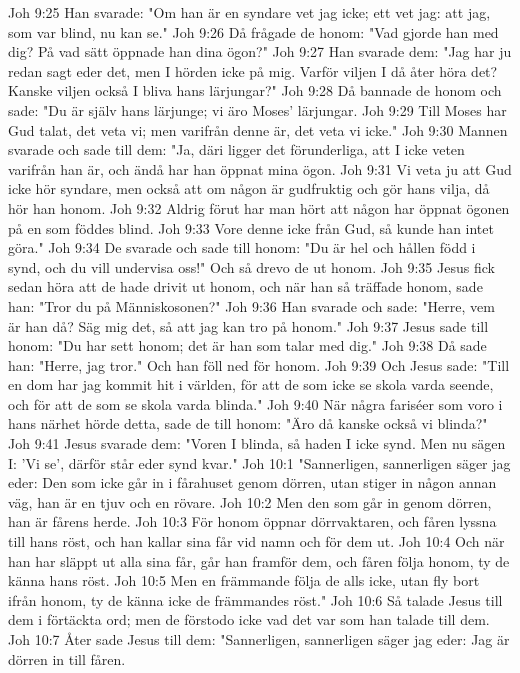 Joh 9:25  Han svarade: "Om han är en syndare vet jag icke; ett vet jag: att jag, som var blind, nu kan se."
Joh 9:26  Då frågade de honom: "Vad gjorde han med dig? På vad sätt öppnade han dina ögon?"
Joh 9:27  Han svarade dem: "Jag har ju redan sagt eder det, men I hörden icke på mig. Varför viljen I då åter höra det? Kanske viljen också I bliva hans lärjungar?"
Joh 9:28  Då bannade de honom och sade: "Du är själv hans lärjunge; vi äro Moses' lärjungar.
Joh 9:29  Till Moses har Gud talat, det veta vi; men varifrån denne är, det veta vi icke."
Joh 9:30  Mannen svarade och sade till dem: "Ja, däri ligger det förunderliga, att I icke veten varifrån han är, och ändå har han öppnat mina ögon.
Joh 9:31  Vi veta ju att Gud icke hör syndare, men också att om någon är gudfruktig och gör hans vilja, då hör han honom.
Joh 9:32  Aldrig förut har man hört att någon har öppnat ögonen på en som föddes blind.
Joh 9:33  Vore denne icke från Gud, så kunde han intet göra."
Joh 9:34  De svarade och sade till honom: "Du är hel och hållen född i synd, och du vill undervisa oss!" Och så drevo de ut honom.
Joh 9:35  Jesus fick sedan höra att de hade drivit ut honom, och när han så träffade honom, sade han: "Tror du på Människosonen?"
Joh 9:36  Han svarade och sade: "Herre, vem är han då? Säg mig det, så att jag kan tro på honom."
Joh 9:37  Jesus sade till honom: "Du har sett honom; det är han som talar med dig."
Joh 9:38  Då sade han: "Herre, jag tror." Och han föll ned för honom.
Joh 9:39  Och Jesus sade: "Till en dom har jag kommit hit i världen, för att de som icke se skola varda seende, och för att de som se skola varda blinda."
Joh 9:40  När några fariséer som voro i hans närhet hörde detta, sade de till honom: "Äro då kanske också vi blinda?"
Joh 9:41  Jesus svarade dem: "Voren I blinda, så haden I icke synd. Men nu sägen I: 'Vi se', därför står eder synd kvar."
Joh 10:1  "Sannerligen, sannerligen säger jag eder: Den som icke går in i fårahuset genom dörren, utan stiger in någon annan väg, han är en tjuv och en rövare.
Joh 10:2  Men den som går in genom dörren, han är fårens herde.
Joh 10:3  För honom öppnar dörrvaktaren, och fåren lyssna till hans röst, och han kallar sina får vid namn och för dem ut.
Joh 10:4  Och när han har släppt ut alla sina får, går han framför dem, och fåren följa honom, ty de känna hans röst.
Joh 10:5  Men en främmande följa de alls icke, utan fly bort ifrån honom, ty de känna icke de främmandes röst."
Joh 10:6  Så talade Jesus till dem i förtäckta ord; men de förstodo icke vad det var som han talade till dem.
Joh 10:7  Åter sade Jesus till dem: "Sannerligen, sannerligen säger jag eder: Jag är dörren in till fåren.
